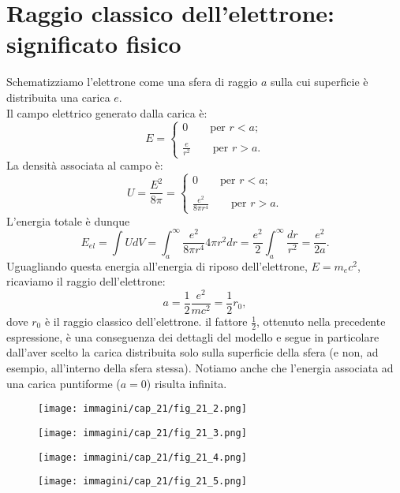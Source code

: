\documentclass[a4paper,12pt,oneside]{book}
\begin{document}
\section[Raggio classico dell'elettrone]{Raggio classico dell'elettrone: significato fisico}
Schematizziamo l'elettrone come una sfera di raggio $a$ sulla cui superficie è distribuita una carica $e$.\\

Il campo elettrico generato dalla carica è:
\begin{equation}
E=\begin{cases}
0 \qquad \textrm{per }r<a;\\
\\
\displaystyle{\frac{e}{r^2}} \qquad \textrm{per }r>a.
\end{cases}
\end{equation}
La densità associata al campo è:
\begin{equation}
U=\frac{E^2}{8\pi}=\begin{cases}
0 \qquad \textrm{per }r<a;\\
\\
\displaystyle{\frac{e^2}{8\pi r^4}} \qquad \textrm{per }r>a.
\end{cases}
\end{equation}
L'energia totale è dunque
\begin{equation}
E_{el}=\int U dV = \int _a ^{\infty} \frac{e^2}{8\pi r^4} 4\pi r^2 dr = \frac{e^2}{2} \int _a ^{\infty} \frac{dr}{r^2}=\frac{e^2}{2a}. 
\end{equation}
Uguagliando questa energia all'energia di riposo dell'elettrone, $E=m_e c^2$, ricaviamo il raggio dell'elettrone:
\begin{equation}
a=\frac{1}{2}\frac{e^2}{mc^2}=\frac{1}{2} r_0,
\end{equation}
dove $r_0$ è il raggio classico dell'elettrone. il fattore $\frac{1}{2}$, ottenuto nella precedente espressione, è una conseguenza dei dettagli del modello e segue in particolare dall'aver scelto la carica distribuita solo sulla superficie della sfera (e non, ad esempio, all'interno della sfera stessa). Notiamo anche che l'energia associata ad una carica puntiforme ($a=0$) risulta infinita.
\begin{figure}[!htbp]
\begin{center}
\texttt{[image: immagini/cap\_21/fig\_21\_2.png]}\\
\end{center}
\end{figure}
\begin{figure}[!htbp]
\begin{center}
\texttt{[image: immagini/cap\_21/fig\_21\_3.png]}\\
\end{center}
\end{figure}
\begin{figure}[!htbp]
\begin{center}
\texttt{[image: immagini/cap\_21/fig\_21\_4.png]}\\
\end{center}
\end{figure}
\begin{figure}[!htbp]
\begin{center}
\texttt{[image: immagini/cap\_21/fig\_21\_5.png]}
\end{center}
\end{figure}
\end{document}
